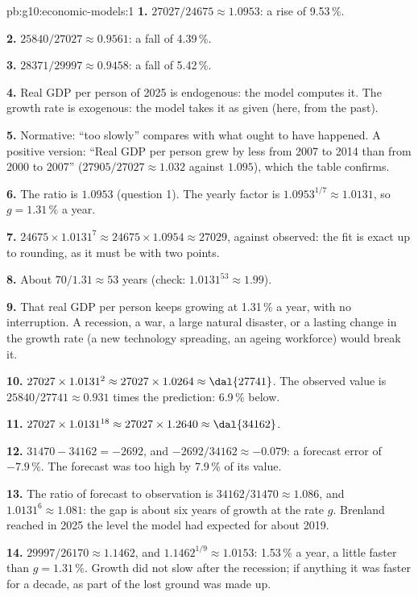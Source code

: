 \begin{solution}{pb:g10:economic-models:1}
\textbf{1.} $27027/24675 \approx 1.0953$: a rise of 9.53\,\%.

\textbf{2.} $25840/27027 \approx 0.9561$: a fall of 4.39\,\%.

\textbf{3.} $28371/29997 \approx 0.9458$: a fall of 5.42\,\%.

\textbf{4.} Real GDP per person of 2025 is endogenous: the model computes it. The growth rate is
exogenous: the model takes it as given (here, from the past).

\textbf{5.} Normative: ``too slowly'' compares with what ought to have happened. A positive version:
``Real GDP per person grew by less from 2007 to 2014 than from 2000 to 2007'' ($27905/27027 \approx
1.032$ against $1.095$), which the table confirms.

\textbf{6.} The ratio is $1.0953$ (question 1). The yearly factor is $1.0953^{1/7} \approx 1.0131$, so
$g = 1.31\,\%$ a year.

\textbf{7.} $24675 \times 1.0131^{7} \approx 24675 \times 1.0954 \approx 27029$, against 
observed: the fit is exact up to rounding, as it must be with two points.

\textbf{8.} About $70/1.31 \approx 53$ years (check: $1.0131^{53} \approx 1.99$).

\textbf{9.} That real GDP per person keeps growing at 1.31\,\% a year, with no interruption. A
recession, a war, a large natural disaster, or a lasting change in the growth rate (a new technology
spreading, an ageing workforce) would break it.

\textbf{10.} $27027 \times 1.0131^{2} \approx 27027 \times 1.0264 \approx \text{\dal{27741}}$. The observed
value is $25840/27741 \approx 0.931$ times the prediction: 6.9\,\% below.

\textbf{11.} $27027 \times 1.0131^{18} \approx 27027 \times 1.2640 \approx \text{\dal{34162}}$.

\textbf{12.} $31470 - 34162 = -2692$, and $-2692/34162 \approx -0.079$: a forecast error of
$-7.9\,\%$. The forecast was too high by 7.9\,\% of its value.

\textbf{13.} The ratio of forecast to observation is $34162/31470 \approx 1.086$, and $1.0131^{6}
\approx 1.081$: the gap is about six years of growth at the rate $g$. Brenland reached in 2025 the
level the model had expected for about 2019.

\textbf{14.} $29997/26170 \approx 1.1462$, and $1.1462^{1/9} \approx 1.0153$: 1.53\,\% a year, a little
faster than $g = 1.31\,\%$. Growth did not slow after the recession; if anything it was faster for a
decade, as part of the lost ground was made up.


\end{solution}
